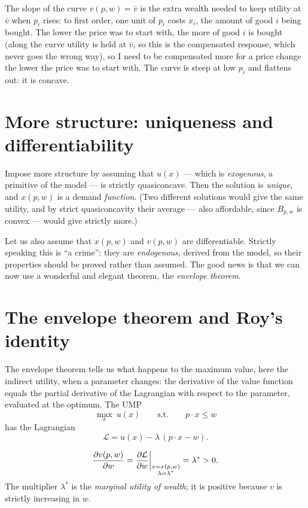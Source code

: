 \documentclass[11pt]{article}
\begin{document}
The slope of the curve $v(p,w)=\bar v$ is the extra wealth needed to keep utility
at $\bar v$ when $p_i$ rises: to first order, one unit of $p_i$ costs $x_i$, the
amount of good $i$ being bought. The lower the price was to start with, the more of
good $i$ is bought (along the curve utility is held at $\bar v$, so this is the
compensated response, which never goes the wrong way), so I need to be compensated more for a price change the lower
the price was to start with. The curve is steep at low $p_i$ and flattens out: it is
concave.


\section{More structure: uniqueness and differentiability}

Impose more structure by assuming that $u(x)$ --- which is \emph{exogenous}, a
primitive of the model --- is strictly quasiconcave. Then the solution is
\emph{unique}, and $x(p,w)$ is a demand \emph{function}. (Two different solutions
would give the same utility, and by strict quasiconcavity their average --- also
affordable, since $B_{p,w}$ is convex --- would give strictly more.)

Let us also assume that $x(p,w)$ and $v(p,w)$ are differentiable. Strictly speaking
this is ``a crime'': they are \emph{endogenous}, derived from the model, so their
properties should be proved rather than assumed. The good news is that we can now
use a wonderful and elegant theorem, the \emph{envelope theorem}.

\section{The envelope theorem and Roy's identity}

The envelope theorem tells us what happens to the maximum value, here the indirect
utility, when a parameter changes: the derivative of the value function equals the
partial derivative of the Lagrangian with respect to the parameter, evaluated at the
optimum. The UMP
\[ \max_{x}\ u(x)\qquad\text{s.t.}\qquad p\cdot x\le w \]
has the Lagrangian
\[ \mathcal{L}=u(x)-\lambda\,(p\cdot x-w). \]

\[ \frac{\partial v(p,w)}{\partial w}
   =\frac{\partial \mathcal{L}}{\partial w}\bigg|_{\substack{x=x(p,w)\\ \lambda=\lambda^{*}}}
   =\lambda^{*}>0 . \]
The multiplier $\lambda^{*}$ is the \emph{marginal utility of wealth}; it is
positive because $v$ is strictly increasing in $w$.
\end{document}
